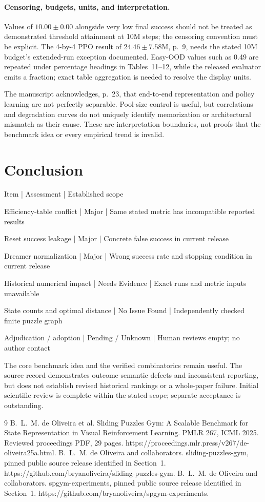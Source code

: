 \documentclass[10pt]{article}
\begin{document}
\paragraph*{Censoring, budgets, units, and interpretation.}\mbox{}\par
Values of \(10.00\pm0.00\) alongside very low final success should not be treated as demonstrated threshold attainment at 10M steps; the censoring convention must be explicit. The 4-by-4 PPO result of \(24.46\pm7.58\)M, p. 9, needs the stated 10M budget’s extended-run exception documented. Easy-OOD values such as 0.49 are repeated under percentage headings in Tables 11–12, while the released evaluator emits a fraction; exact table aggregation is needed to resolve the display units.\par
The manuscript acknowledges, p. 23, that end-to-end representation and policy learning are not perfectly separable. Pool-size control is useful, but correlations and degradation curves do not uniquely identify memorization or architectural mismatch as their cause. These are interpretation boundaries, not proofs that the benchmark idea or every empirical trend is invalid.\par
\section*{Conclusion}
Item | Assessment | Established scope\par
Efficiency-table conflict | Major | Same stated metric has incompatible reported results\par
Reset success leakage | Major | Concrete false success in current release\par
Dreamer normalization | Major | Wrong success rate and stopping condition in current release\par
Historical numerical impact | Needs Evidence | Exact runs and metric inputs unavailable\par
State counts and optimal distance | No Issue Found | Independently checked finite puzzle graph\par
Adjudication / adoption | Pending / Unknown | Human reviews empty; no author contact\par
The core benchmark idea and the verified combinatorics remain useful. The source record demonstrates outcome-semantic defects and inconsistent reporting, but does not establish revised historical rankings or a whole-paper failure. Initial scientific review is complete within the stated scope; separate acceptance is outstanding.\par
9 B. L. M. de Oliveira et al. Sliding Puzzles Gym: A Scalable Benchmark for State Representation in Visual Reinforcement Learning. PMLR 267, ICML 2025. Reviewed proceedings PDF, 29 pages. https://proceedings.mlr.press/v267/de-oliveira25a.html. B. L. M. de Oliveira and collaborators. sliding-puzzles-gym, pinned public source release identified in Section 1. https://github.com/bryanoliveira/sliding-puzzles-gym. B. L. M. de Oliveira and collaborators. spgym-experiments, pinned public source release identified in Section 1. https://github.com/bryanoliveira/spgym-experiments.\par
\end{document}
